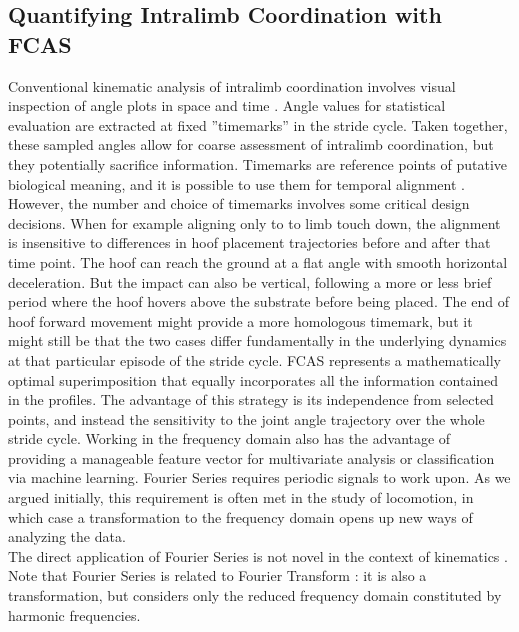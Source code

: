 \documentclass[10pt, a4paper]{article}
\begin{document}
\subsection{Quantifying Intralimb Coordination with FCAS}
Conventional kinematic analysis of intralimb coordination involves visual inspection of angle plots in space and time \citep{Irschick1999,Fischer2002,Stoessel2012,Schmidt2008,Day2007,Polk2002,Nyakatura2010}. 
Angle values for statistical evaluation are extracted at fixed ''timemarks'' in the stride cycle. 
Taken together, these sampled angles allow for coarse assessment of intralimb coordination, but they potentially sacrifice information. 
Timemarks are reference points of putative biological meaning, and it is possible to use them for temporal alignment \citep[e.g.][]{HsiaoWecksler2010}. 
However, the number and choice of timemarks involves some critical design decisions. 
When for example aligning only to to limb touch down, the alignment is insensitive to differences in hoof placement trajectories before and after that time point. 
The hoof can reach the ground at a flat angle with smooth horizontal deceleration. 
But the impact can also be vertical, following a more or less brief period where the hoof hovers above the substrate before being placed. 
The end of hoof forward movement might provide a more homologous timemark, but it might still be that the two cases differ fundamentally in the underlying dynamics at that particular episode of the stride cycle. 
FCAS represents a mathematically optimal superimposition that equally incorporates all the information contained in the profiles. 
The advantage of this strategy is its independence from selected points, and instead the sensitivity to the joint angle trajectory over the whole stride cycle. 
Working in the frequency domain also has the advantage of providing a manageable feature vector for multivariate analysis or classification via machine learning. 
Fourier Series requires periodic signals to work upon. 
As we argued initially, this requirement is often met in the study of locomotion, in which case a transformation to the frequency domain opens up new ways of analyzing the data. 
\\The direct application of Fourier Series \citep{Fourier1822,Gray1995,Bracewell2000} is not novel in the context of kinematics \citep[e.g.][]{Bernstein1935,Webb2007,Wheat2006}. 
Note that Fourier Series is related to Fourier Transform \citep[cf.][]{Bracewell2000,Robertson2018}: it is also a transformation, but considers only the reduced frequency domain constituted by harmonic frequencies. 
\end{document}
